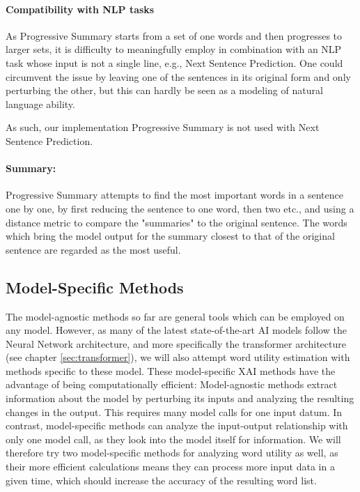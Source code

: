 \paragraph{Compatibility with NLP tasks}
As Progressive Summary starts from a set of one words and then progresses to larger sets, it is difficulty to meaningfully employ in combination with an NLP task whose input is not a single line, e.g., Next Sentence Prediction.
One could circumvent the issue by leaving one of the sentences in its original form and only perturbing the other, but this can hardly be seen as a modeling of natural language ability.


As such, our implementation Progressive Summary is not used with Next Sentence Prediction.

\paragraph{Summary:}
Progressive Summary attempts to find the most important words in a sentence one by one, by first reducing the sentence to one word, then two etc., and using a distance metric to compare the "summaries" to the original sentence.
The words which bring the model output for the summary closest to that of the original sentence are regarded as the most useful.

\subsection{Model-Specific Methods}
The model-agnostic methods so far are general tools which can be employed on any model.
However, as many of the latest state-of-the-art AI models follow the Neural Network architecture, and more specifically the transformer architecture (see chapter \ref{sec:transformer}), we will also attempt word utility estimation with methods specific to these model.
These model-specific XAI methods have the advantage of being computationally efficient:
Model-agnostic methods extract information about the model by perturbing its inputs and analyzing the resulting changes in the output.
This requires many model calls for one input datum.
In contrast, model-specific methods can analyze the input-output relationship with only one model call, as they look into the model itself for information.
We will therefore try two model-specific methods for analyzing word utility as well, as their more efficient calculations means they can process more input data in a given time, which should increase the accuracy of the resulting word list.

